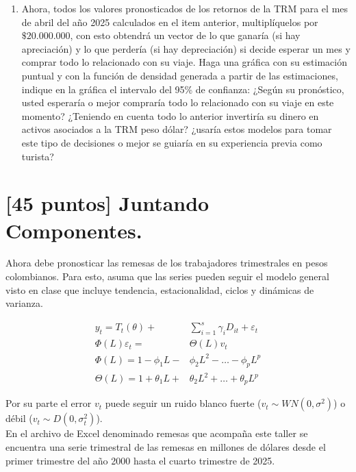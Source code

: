 \documentclass{article}
\theoremstyle{remark}
\theoremstyle{definition}
\begin{document}
\begin{enumerate}[label = \emph{\alph*})]
\begin{tcolorbox}[title=Soluci\'on 2.i]
        \end{tcolorbox}
    \item {Ahora, todos los valores pronosticados de los retornos de la TRM para el mes de abril del año 2025 calculados en el item anterior, multipl\'iquelos por $\$20.000.000$, con esto obtendr\'a un vector de lo que ganar\'ia (si hay apreciaci\'on) y lo que perder\'ia (si hay depreciaci\'on) si decide esperar un mes y comprar todo lo relacionado con su viaje. Haga una gr\'afica con su estimaci\'on puntual y con la funci\'on de densidad generada a partir de las estimaciones, indique en la gr\'afica el intervalo del 95\% de confianza: ¿Seg\'un su pron\'ostico, usted esperar\'ia o mejor comprar\'ia todo lo relacionado con su viaje en este momento? ¿Teniendo en cuenta todo lo anterior invertir\'ia su dinero en activos asociados a la TRM peso d\'olar? ¿usar\'ia estos modelos para tomar este tipo de decisiones o mejor se guiar\'ia en su experiencia previa como turista?}
        \begin{tcolorbox}[title=Soluci\'on 2.j]
            
        \end{tcolorbox}
\end{enumerate}

\section{[45 puntos] Juntando Componentes.}

{Ahora debe pronosticar las remesas de los trabajadores trimestrales en pesos colombianos. Para esto, asuma que las series pueden seguir el modelo general visto en clase que incluye tendencia, estacionalidad, ciclos y din\'amicas de varianza.}

\begin{align*}
    y_t = T_t(\theta) +& \sum_{i=1}^{s} \gamma_i D_{it} + \varepsilon_t \\
    \Phi(L) \varepsilon_t =& \Theta(L) v_t \\
    \Phi(L) = 1 - \phi_1 L -& \phi_2 L^2 - \dots - \phi_p L^p \\
    \Theta(L) = 1 + \theta_1 L +& \theta_2 L^2 + \dots + \theta_p L^p
\end{align*}

{Por su parte el error $v_t$ puede seguir un ruido blanco fuerte ($v_t\sim WN(0,
\sigma^2)$) o d\'ebil ($v_t\sim D(0,\sigma_t^2)$).} \\

{En el archivo de Excel denominado remesas que acompaña este taller se encuentra una serie trimestral de las remesas en millones de d\'olares desde el primer trimestre del año 2000 hasta el cuarto trimestre de 2025.}
\end{document}
